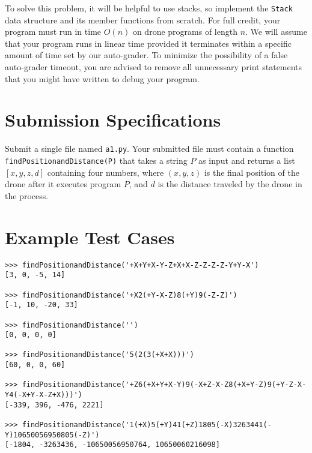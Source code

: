 \documentclass{article}
\begin{document}
To solve this problem, it will be helpful to use stacks, so implement the \texttt{Stack} data structure and its member functions from scratch. For full credit, your program must run in time $O(n)$ on drone programs of length $n$. We will assume that your program runs in linear time provided it terminates within a specific amount of time set by our auto-grader. To minimize the possibility of a false auto-grader timeout, you are advised to remove all unnecessary print statements that you might have written to debug your program.

\section{Submission Specifications}
Submit a single file named \texttt{a1.py}. Your submitted file must contain a function \texttt{findPositionandDistance(P)} that takes a string $P$ as input and returns a list $[x, y, z, d]$ containing four numbers, where $(x, y, z)$ is the final position of the drone after it executes program $P$, and $d$ is the distance traveled by the drone in the process.

\section{Example Test Cases}
\begin{verbatim}
>>> findPositionandDistance('+X+Y+X-Y-Z+X+X-Z-Z-Z-Z-Y+Y-X')
[3, 0, -5, 14]

>>> findPositionandDistance('+X2(+Y-X-Z)8(+Y)9(-Z-Z)')
[-1, 10, -20, 33]

>>> findPositionandDistance('')
[0, 0, 0, 0]

>>> findPositionandDistance('5(2(3(+X+X)))')
[60, 0, 0, 60]

>>> findPositionandDistance('+Z6(+X+Y+X-Y)9(-X+Z-X-Z8(+X+Y-Z)9(+Y-Z-X-Y4(-X+Y-X-Z+X)))')
[-339, 396, -476, 2221]

>>> findPositionandDistance('1(+X)5(+Y)41(+Z)1805(-X)3263441(-Y)10650056950805(-Z)')
[-1804, -3263436, -10650056950764, 10650060216098]
\end{verbatim}
\thispagestyle{plain}
\end{document}
